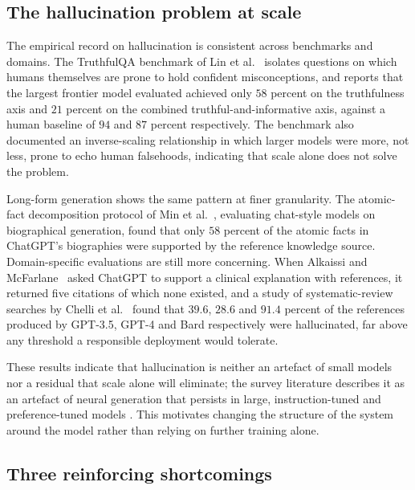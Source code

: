 \subsection{The hallucination problem at scale}
\label{sec:halluc-scale}

The empirical record on hallucination is consistent across benchmarks and domains. The TruthfulQA benchmark of Lin et al.~\cite{lin-etal-2022-truthfulqa} isolates questions on which humans themselves are prone to hold confident misconceptions, and reports that the largest frontier model evaluated achieved only $58$ percent on the truthfulness axis and $21$ percent on the combined truthful-and-informative axis, against a human baseline of $94$ and $87$ percent respectively. The benchmark also documented an inverse-scaling relationship in which larger models were more, not less, prone to echo human falsehoods, indicating that scale alone does not solve the problem.

Long-form generation shows the same pattern at finer granularity. The atomic-fact decomposition protocol of Min et al.~\cite{min-etal-2023-factscore}, evaluating chat-style models on biographical generation, found that only $58$ percent of the atomic facts in ChatGPT's biographies were supported by the reference knowledge source. Domain-specific evaluations are still more concerning. When Alkaissi and McFarlane~\cite{alkaissi2023artificial} asked ChatGPT to support a clinical explanation with references, it returned five citations of which none existed, and a study of systematic-review searches by Chelli et al.~\cite{info:doi/10.2196/53164} found that $39.6$, $28.6$ and $91.4$ percent of the references produced by GPT-3.5, GPT-4 and Bard respectively were hallucinated, far above any threshold a responsible deployment would tolerate.

These results indicate that hallucination is neither an artefact of small models nor a residual that scale alone will eliminate; the survey literature describes it as an artefact of neural generation that persists in large, instruction-tuned and preference-tuned models \cite{ji2023survey,huang2025survey}. This motivates changing the structure of the system around the model rather than relying on further training alone.

\subsection{Three reinforcing shortcomings}
\label{sec:stateless-gap}

